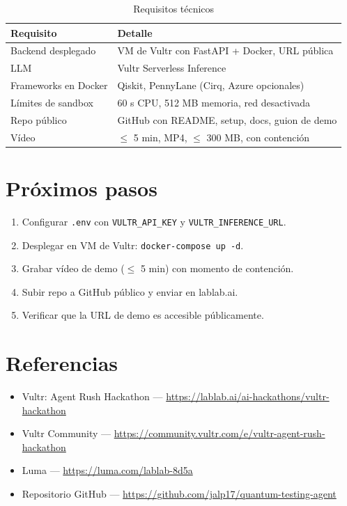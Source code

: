 \documentclass[11pt,a4paper]{article}
\begin{document}
\begin{table}[h]
\centering
\begin{tabular}{ll}
\toprule
\textbf{Requisito} & \textbf{Detalle} \\
\midrule
Backend desplegado & VM de Vultr con FastAPI + Docker, URL pública \\
LLM & Vultr Serverless Inference \\
Frameworks en Docker & Qiskit, PennyLane (Cirq, Azure opcionales) \\
Límites de sandbox & 60 s CPU, 512 MB memoria, red desactivada \\
Repo público & GitHub con README, setup, docs, guion de demo \\
Vídeo & $\leq$ 5 min, MP4, $\leq$ 300 MB, con contención \\
\bottomrule
\end{tabular}
\caption{Requisitos técnicos}
\end{table}

\section{Próximos pasos}

\begin{enumerate}
    \item Configurar \texttt{.env} con \texttt{VULTR\_API\_KEY} y
    \texttt{VULTR\_INFERENCE\_URL}.
    \item Desplegar en VM de Vultr: \texttt{docker-compose up -d}.
    \item Grabar vídeo de demo ($\leq$ 5 min) con momento de contención.
    \item Subir repo a GitHub público y enviar en lablab.ai.
    \item Verificar que la URL de demo es accesible públicamente.
\end{enumerate}

\section{Referencias}

\begin{itemize}
    \item Vultr: Agent Rush Hackathon --- \url{https://lablab.ai/ai-hackathons/vultr-hackathon}
    \item Vultr Community --- \url{https://community.vultr.com/e/vultr-agent-rush-hackathon}
    \item Luma --- \url{https://luma.com/lablab-8d5a}
    \item Repositorio GitHub --- \url{https://github.com/jalp17/quantum-testing-agent}
\end{itemize}
\end{document}
